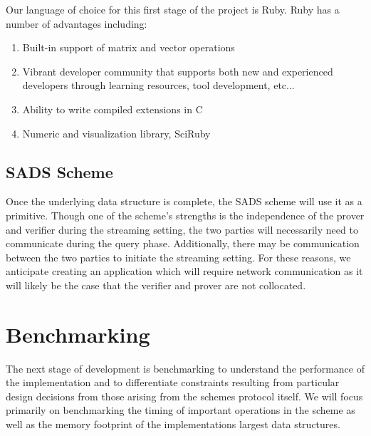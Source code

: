 \documentclass[11pt, letterpaper, oneside]{article}
\begin{document}
	Our language of choice for this first stage of the project is Ruby. Ruby has a number of advantages including:

	\begin{enumerate}
	\item Built-in support of matrix and vector operations
	\item Vibrant developer community that supports both new and experienced developers through learning resources, tool development, etc...
	\item Ability to write compiled extensions in C
	\item Numeric and visualization library, SciRuby
	\end{enumerate}

	\subsection{SADS Scheme}

	Once the underlying data structure is complete, the SADS scheme will use it as a primitive.
	Though one of the scheme's strengths is the independence of the prover and verifier during the streaming setting, the two parties will necessarily need to communicate during the query phase.
	Additionally, there may be communication between the two parties to initiate the streaming setting.
	For these reasons, we anticipate creating an application which will require network communication as it will likely be the case that the verifier and prover are not collocated.


\section{ Benchmarking }
	
	The next stage of development is benchmarking to understand the performance of the implementation and to differentiate constraints resulting from particular design decisions from those arising from the schemes protocol itself.
	We will focus primarily on benchmarking the timing of important operations in the scheme as well as the memory footprint of the implementations largest data structures.
	
\end{document}
